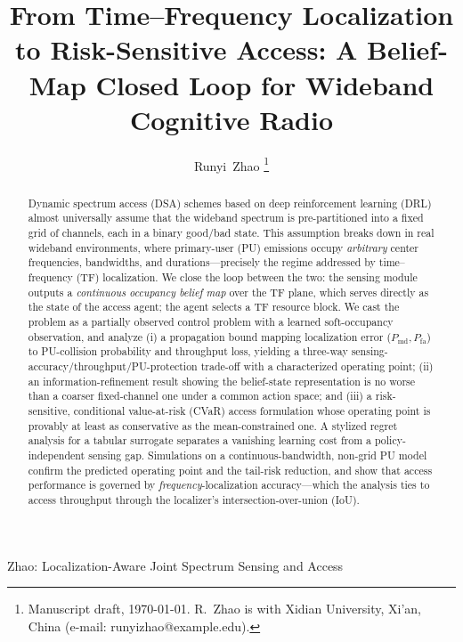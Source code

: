 \documentclass[journal]{IEEEtran}
\begin{document}
\title{From Time--Frequency Localization to Risk-Sensitive Access:
A Belief-Map Closed Loop for Wideband Cognitive Radio}

\author{Runyi~Zhao
\thanks{Manuscript draft, \today. R.~Zhao is with Xidian University, Xi'an,
China (e-mail: runyizhao@example.edu).}}

%
{Zhao: Localization-Aware Joint Spectrum Sensing and Access}

\maketitle

\begin{abstract}
Dynamic spectrum access (DSA) schemes based on deep reinforcement
learning (DRL) almost universally assume that the wideband spectrum is
pre-partitioned into a fixed grid of channels, each in a binary good/bad
state. This assumption breaks down in real wideband environments, where
primary-user (PU) emissions occupy \emph{arbitrary} center frequencies,
bandwidths, and durations---precisely the regime addressed by
time--frequency (TF) localization. We close the loop between the two: the
sensing module outputs a \emph{continuous occupancy belief map} over the TF
plane, which serves directly as the state of the access agent; the agent
selects a TF resource block. We cast the problem as a partially observed
control problem with a learned soft-occupancy observation, and analyze (i) a
propagation bound mapping localization error ($P_{\mathrm{md}},
P_{\mathrm{fa}}$) to PU-collision probability and throughput loss, yielding a
three-way sensing-accuracy/throughput/PU-protection trade-off with a
characterized operating point; (ii) an information-refinement result showing
the belief-state representation is no worse than a coarser fixed-channel one
under a common action space; and (iii) a risk-sensitive, conditional
value-at-risk (CVaR) access formulation whose operating point is provably at
least as conservative as the mean-constrained one. A stylized regret analysis for a tabular surrogate
separates a vanishing learning cost from a policy-independent sensing gap.
Simulations on a continuous-bandwidth, non-grid PU model confirm the
predicted operating point and the tail-risk reduction, and show that access
performance is governed by \emph{frequency}-localization accuracy---which the
analysis ties to access throughput through the localizer's
intersection-over-union (IoU).
\end{abstract}
\end{document}
